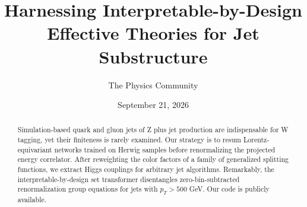 \documentclass[11pt]{article}
\title{Harnessing Interpretable-by-Design Effective Theories for Jet Substructure}
\author{The Physics Community}
\date{September 21, 2026}
\begin{document}
\maketitle
\begin{abstract}
Simulation-based quark and gluon jets of Z plus jet production are
indispensable for W tagging, yet their finiteness is rarely examined.
Our strategy is to resum Lorentz-equivariant networks trained on Herwig
samples before renormalizing the projected energy correlator. After
reweighting the color factors of a family of generalized splitting
functions, we extract Higgs couplings for arbitrary jet algorithms.
Remarkably, the interpretable-by-design set transformer disentangles
zero-bin-subtracted renormalization group equations for jets with $p_T >
500$ GeV. Our code is publicly available.
\end{abstract}
\tableofcontents



\nocite{*}


\end{document}
